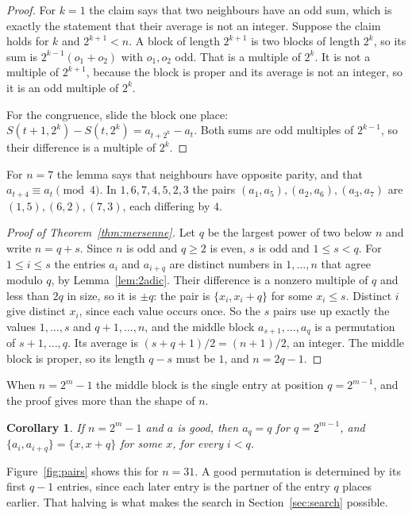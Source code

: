 \documentclass[11pt]{amsart}
\newtheorem{corollary}[theorem]{Corollary}
\theoremstyle{remark}
\begin{document}
\begin{proof}
For $k=1$ the claim says that two neighbours have an odd sum, which is exactly the statement that their average is not an integer. Suppose the claim holds for $k$ and $2^{k+1}<n$. A block of length $2^{k+1}$ is two blocks of length $2^k$, so its sum is $2^{k-1}(o_1+o_2)$ with $o_1,o_2$ odd. That is a multiple of $2^k$. It is not a multiple of $2^{k+1}$, because the block is proper and its average is not an integer, so it is an odd multiple of $2^k$.

For the congruence, slide the block one place: $S(t+1,2^k)-S(t,2^k)=a_{t+2^k}-a_t$. Both sums are odd multiples of $2^{k-1}$, so their difference is a multiple of $2^k$.
\end{proof}

For $n=7$ the lemma says that neighbours have opposite parity, and that $a_{t+4}\equiv a_t\pmod4$. In $1,6,7,4,5,2,3$ the pairs $(a_1,a_5),(a_2,a_6),(a_3,a_7)$ are $(1,5),(6,2),(7,3)$, each differing by $4$.

\begin{proof}[Proof of Theorem~\ref{thm:mersenne}]
Let $q$ be the largest power of two below $n$ and write $n=q+s$. Since $n$ is odd and $q\ge2$ is even, $s$ is odd and $1\le s<q$. For $1\le i\le s$ the entries $a_i$ and $a_{i+q}$ are distinct numbers in $1,\dots,n$ that agree modulo $q$, by Lemma~\ref{lem:2adic}. Their difference is a nonzero multiple of $q$ and less than $2q$ in size, so it is $\pm q$: the pair is $\{x_i,x_i+q\}$ for some $x_i\le s$. Distinct $i$ give distinct $x_i$, since each value occurs once. So the $s$ pairs use up exactly the values $1,\dots,s$ and $q+1,\dots,n$, and the middle block $a_{s+1},\dots,a_q$ is a permutation of $s+1,\dots,q$. Its average is $(s+q+1)/2=(n+1)/2$, an integer. The middle block is proper, so its length $q-s$ must be $1$, and $n=2q-1$.
\end{proof}

When $n=2^m-1$ the middle block is the single entry at position $q=2^{m-1}$, and the proof gives more than the shape of $n$.

\begin{corollary}\label{cor:reduction}
If $n=2^m-1$ and $a$ is good, then $a_q=q$ for $q=2^{m-1}$, and $\{a_i,a_{i+q}\}=\{x,x+q\}$ for some $x$, for every $i<q$.
\end{corollary}

Figure~\ref{fig:pairs} shows this for $n=31$. A good permutation is determined by its first $q-1$ entries, since each later entry is the partner of the entry $q$ places earlier. That halving is what makes the search in Section~\ref{sec:search} possible.
\end{document}
